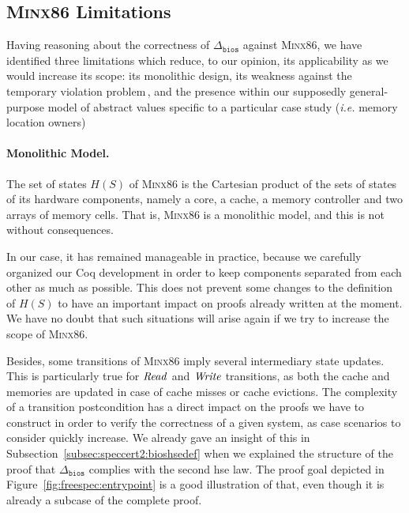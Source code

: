 \subsection{{\scshape Minx86} Limitations}
\label{subsec:freespec:minx86lim}

Having reasoning about the correctness of \( \Delta_{\mathtt{bios}} \) against
{\scshape Minx86}, we have identified three limitations which reduce, to our
opinion, its applicability as we would increase its scope: its monolithic
design, its weakness against the temporary violation
problem\,\cite{muller2006tempviolation}, and the presence within our supposedly
general-purpose model of abstract values specific to a particular case study
(\emph{i.e.}  memory location owners)

\paragraph{Monolithic Model.}
%
The set of states \( H(S) \) of {\scshape Minx86} is the Cartesian product of
the sets of states of its hardware components, namely a core, a cache, a memory
controller and two arrays of memory cells.
%
That is, {\scshape Minx86} is a monolithic model, and this is not without
consequences.

In our case, it has remained manageable in practice, because we carefully
organized our Coq development in order to keep components separated from each
other as much as possible.
%
This does not prevent some changes to the definition of \( H(S) \) to have an
important impact on proofs already written at the moment.
%
We have no doubt that such situations will arise again if we try to increase the
scope of {\scshape Minx86}.

Besides, some transitions of {\scshape Minx86} imply several intermediary state
updates.
%
This is particularly true for \( \mathit{Read} \) and \( \mathit{Write} \)
transitions, as both the cache and memories are updated in case of cache misses
or cache evictions.
%
The complexity of a transition postcondition has a direct impact on the proofs
we have to construct in order to verify the correctness of a given system, as
case scenarios to consider quickly increase.
%
We already gave an insight of this in
Subsection~\ref{subsec:speccert2:bioshsedef} when we explained the structure of
the proof that \( \Delta_{\mathtt{bios}} \) complies with the second \ac{hse}
law.
%
The proof goal depicted in Figure~\ref{fig:freespec:entrypoint} is a good
illustration of that, even though it is already a subcase of the complete proof.

